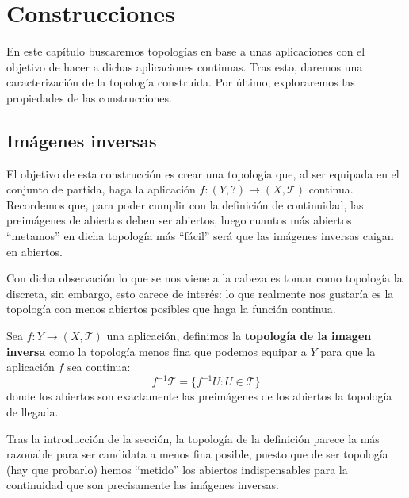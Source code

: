 \chapter{Construcciones}%
\label{cha:construcciones}
En este capítulo buscaremos topologías en base a unas aplicaciones con el objetivo de hacer a dichas aplicaciones continuas. Tras esto, daremos una caracterización de la topología construida. Por último, exploraremos las propiedades de las construcciones.

\section{Imágenes inversas}%
\label{sec:imagenes_inversas}
El objetivo de esta construcción es crear una topología que, al ser equipada en el conjunto de partida, haga la aplicación $f: (Y, ?) \rightarrow \left( X, \mathcal{T} \right)$ continua. Recordemos que, para poder cumplir con la definición de continuidad, las preimágenes de abiertos deben ser abiertos, luego cuantos más abiertos ``metamos'' en dicha topología más ``fácil'' será que las imágenes inversas caigan en abiertos.

Con dicha observación lo que se nos viene a la cabeza es tomar como topología la discreta, sin embargo, esto carece de interés: lo que realmente nos gustaría es la topología con menos abiertos posibles que haga la función continua.

\begin{defi}
Sea $f: Y \rightarrow (X,\mathcal{T})$ una aplicación, definimos la \textbf{topología de la imagen inversa} como la topología menos fina que podemos equipar a $Y$ para que la aplicación $f$ sea continua:
$$
f^{-1} \mathcal{T} = \{f^{-1}U: U \in \mathcal{T}\}
$$
donde los abiertos son exactamente las preimágenes de los abiertos la topología de llegada.
\end{defi}

\begin{obs}
Tras la introducción de la sección, la topología de la definición parece la más razonable para ser candidata a menos fina posible, puesto que de ser topología (hay que probarlo) hemos ``metido'' los abiertos indispensables para la continuidad que son precisamente las imágenes inversas.
\end{obs}

